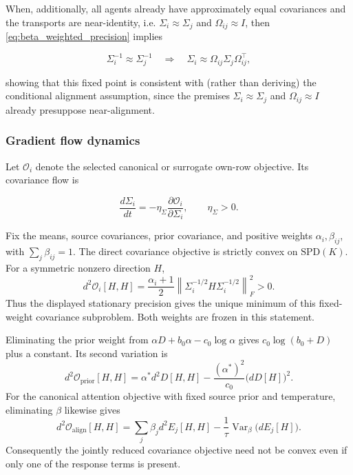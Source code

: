 \documentclass[twoside,11pt]{article}
\begin{document}
When, additionally, all agents already have approximately equal covariances and the transports are near-identity, i.e. $\Sigma_i \approx \Sigma_j$ and $\Omega_{ij} \approx I$, then \eqref{eq:beta_weighted_precision} implies

\begin{equation}
\Sigma_i^{-1} \approx \Sigma_j^{-1}
\quad\Longrightarrow\quad
\Sigma_i \approx \Omega_{ij}\Sigma_j\Omega_{ij}^\top,
\end{equation}

showing that this fixed point is consistent with (rather than deriving) the conditional alignment assumption, since the premises $\Sigma_i \approx \Sigma_j$ and $\Omega_{ij} \approx I$ already presuppose near-alignment.

\subsubsection{Gradient flow dynamics}

Let $\mathcal{O}_i$ denote the selected canonical or surrogate own-row objective. Its covariance flow is

\begin{equation}
\frac{d\Sigma_i}{dt}
=-\eta_\Sigma
\frac{\partial \mathcal{O}_i}{\partial \Sigma_i},
\qquad\eta_\Sigma > 0.
\end{equation}

Fix the means, source covariances, prior covariance, and positive weights $\alpha_i,\beta_{ij}$, with $\sum_j\beta_{ij}=1$. The direct covariance objective is strictly convex on $\mathrm{SPD}(K)$. For a symmetric nonzero direction $H$,
\begin{equation}
d^2\mathcal O_i[H,H]
=\frac{\alpha_i+1}{2}
\left\|\Sigma_i^{-1/2}H\Sigma_i^{-1/2}\right\|_F^2>0.
\label{eq:supp_frozen_covariance_curvature}
\end{equation}
Thus the displayed stationary precision gives the unique minimum of this fixed-weight covariance subproblem. Both weights are frozen in this statement.

Eliminating the prior weight from $\alpha D+b_0\alpha-c_0\log\alpha$ gives $c_0\log(b_0+D)$ plus a constant. Its second variation is
\begin{equation}
d^2\mathcal O_{\mathrm{prior}}[H,H]
=\alpha^*d^2D[H,H]
-\frac{(\alpha^*)^2}{c_0}\bigl(dD[H]\bigr)^2.
\label{eq:supp_alpha_curvature}
\end{equation}
For the canonical attention objective with fixed source prior and temperature, eliminating $\beta$ likewise gives
\begin{equation}
d^2\mathcal O_{\mathrm{align}}[H,H]
=\sum_j\beta_jd^2E_j[H,H]
-\frac{1}{\tau}\operatorname{Var}_{\beta}\bigl(dE_j[H]\bigr).
\label{eq:supp_beta_curvature}
\end{equation}
Consequently the jointly reduced covariance objective need not be convex even if only one of the response terms is present.
\end{document}
